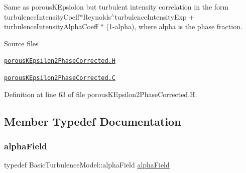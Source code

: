 Same as porous\+K\+Epsiolon but turbulent intensity correlation in the form turbulence\+Intensity\+Coeff$\ast$\+Reynolds$^\wedge$turbulence\+Intensity\+Exp + turbulence\+Intensity\+Alpha\+Coeff $\ast$ (1-\/alpha), where alpha is the phase fraction. 

\label{_Description}%
 \begin{DoxyParagraph}{Source files}

\begin{DoxyItemize}
\item \href{../../../home/carlo/data/GeN-Foam/GeN-Foam_ffn/GeN-Foam/GeN-Foam/classes/thermalHydraulics/src/physicsModels/turbulenceModels/porousKEpsilon2PhaseCorrected/porousKEpsilon2PhaseCorrected.H}{\tt porous\+K\+Epsilon2\+Phase\+Corrected.\+H} 
\item \href{../../../home/carlo/data/GeN-Foam/GeN-Foam_ffn/GeN-Foam/GeN-Foam/classes/thermalHydraulics/src/physicsModels/turbulenceModels/porousKEpsilon2PhaseCorrected/porousKEpsilon2PhaseCorrected.C}{\tt porous\+K\+Epsilon2\+Phase\+Corrected.\+C} 
\end{DoxyItemize}
\end{DoxyParagraph}


Definition at line 63 of file porous\+K\+Epsilon2\+Phase\+Corrected.\+H.



\subsection{Member Typedef Documentation}
\mbox{\label{classFoam_1_1RASModels_1_1porousKEpsilon2PhaseCorrected_a06a66094f33d6817d19225445c5ea874}} 
\subsubsection{\texorpdfstring{alpha\+Field}{alphaField}}
{\footnotesize\ttfamily typedef Basic\+Turbulence\+Model\+::alpha\+Field \hyperlink{classFoam_1_1RASModels_1_1porousKEpsilon2PhaseCorrected_a06a66094f33d6817d19225445c5ea874}{alpha\+Field}}



